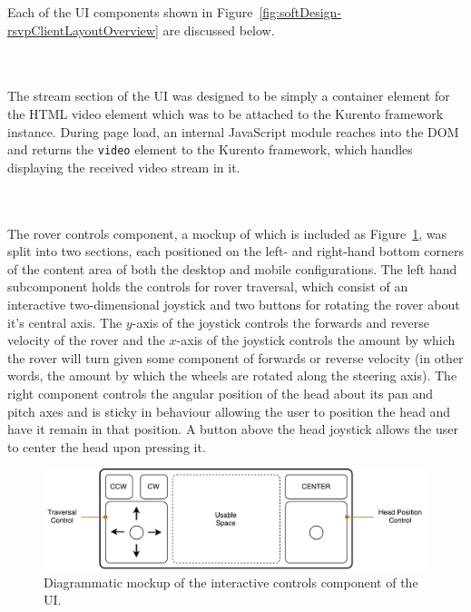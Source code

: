         Each of the UI components shown in Figure~\ref{fig:softDesign-rsvpClientLayoutOverview} are discussed below.
        
      \\\\
        The stream section of the UI was designed to be simply a container element for the HTML video element which was to be attached to the Kurento framework instance. During page load, an internal JavaScript module reaches into the DOM and returns the \texttt{video} element to the Kurento framework, which handles displaying the received video stream in it.
              
      \\\\
        The rover controls component, a mockup of which is included as Figure~\ref{fig:softDesign-controlUIComponentDesign}, was split into two sections, each positioned on the left- and right-hand bottom corners of the content area of both the desktop and mobile configurations. The left hand subcomponent holds the controls for rover traversal, which consist of an interactive two-dimensional joystick and two buttons for rotating the rover about it's central axis. The $y$-axis of the joystick controls the forwards and reverse velocity of the rover and the $x$-axis of the joystick controls the amount by which the rover will turn given some component of forwards or reverse velocity (in other words, the amount by which the wheels are rotated along the steering axis). The right component controls the angular position of the head about its pan and pitch axes and is sticky in behaviour allowing the user to position the head and have it remain in that position. A button above the head joystick allows the user to center the head upon pressing it.
      
        \begin{figure}[h!]
          \centering
          \includegraphics[width=0.8\linewidth]{figures/softDesign-controlsUIComponentDesign}
          \caption[Diagrammatic mockup of the interactive control component of the UI.]{Diagrammatic mockup of the interactive controls component of the UI.}
          \label{fig:softDesign-controlUIComponentDesign}
        \end{figure}
        
